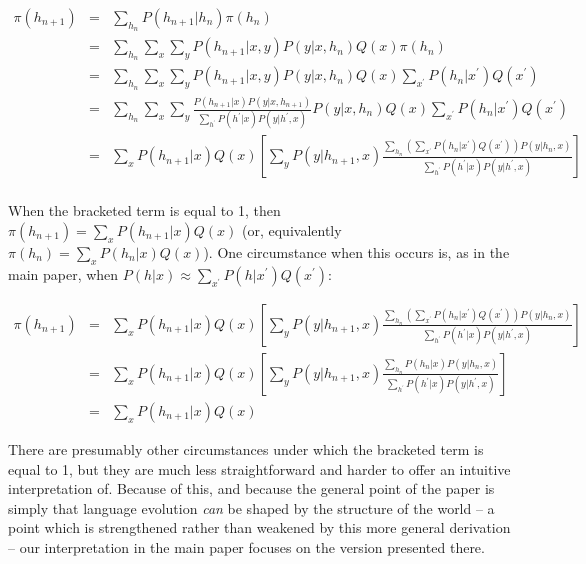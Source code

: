 \documentclass{apa}
\begin{document}
\footnotesize
\begin{eqnarray*}
\pi(h_{n+1})
&=& \sum_{h_n} P(h_{n+1} | h_n) \pi(h_n) \\
&=& \sum_{h_n} \sum_x \sum_y P(h_{n+1} | x, y) P(y | x, h_n) Q(x) \pi(h_n) \\
&=& \sum_{h_n} \sum_x \sum_y P(h_{n+1} | x, y) P(y | x, h_n) Q(x) \sum_{x^\prime} P(h_n | x^\prime) Q(x^\prime) \\
&=& \sum_{h_n} \sum_x \sum_y \frac{P(h_{n+1} | x) P(y | x, h_{n+1})}{\sum_{h^\prime} P(h^\prime | x) P(y|h^\prime,x)} P(y | x, h_n) Q(x) \sum_{x^\prime} P(h_n | x^\prime) Q(x^\prime) \\
&=& \sum_x P(h_{n+1}|x) Q(x) \left[ \sum_y P(y|h_{n+1},x) \frac{\sum_{h_n} (\sum_{x^\prime} P(h_n|x^\prime) Q(x^\prime)) P(y|h_n,x)}{\sum_{h^\prime} P(h^\prime|x)P(y|h^\prime,x)}\right] \\
\end{eqnarray*}
\normalsize

When the bracketed term is equal to 1, then $\pi(h_{n+1}) = \sum_x P(h_{n+1} | x) Q(x)$ (or, equivalently $\pi(h_n) = \sum_x P(h_n | x) Q(x)$). One circumstance when this occurs is, as in the main paper, when $P(h|x) \approx \sum_{x^\prime} P(h | x^\prime) Q(x^\prime)$:

\footnotesize
\begin{eqnarray*}
\pi(h_{n+1})
&=& \sum_x P(h_{n+1}|x) Q(x) \left[ \sum_y P(y|h_{n+1},x) \frac{\sum_{h_n} (\sum_{x^\prime} P(h_n|x^\prime) Q(x^\prime)) P(y|h_n,x)}{\sum_{h^\prime} P(h^\prime|x)P(y|h^\prime,x)}\right] \\
&=& \sum_x P(h_{n+1}|x) Q(x) \left[ \sum_y P(y|h_{n+1},x) \frac{\sum_{h_n} P(h_n|x) P(y|h_n,x)}{\sum_{h^\prime} P(h^\prime|x)P(y|h^\prime,x)}\right] \\
&=& \sum_x P(h_{n+1}|x) Q(x)
\end{eqnarray*}
\normalsize

There are presumably other circumstances under which the bracketed term is equal to 1, but they are much less straightforward and harder to offer an intuitive interpretation of. Because of this, and because the general point of the paper is simply that language evolution {\it can} be shaped by the structure of the world -- a point which is strengthened rather than weakened by this more general derivation -- our interpretation in the main paper focuses on the version presented there.

\renewcommand{\bibliographytypesize}{\footnotesize}

\end{document}
